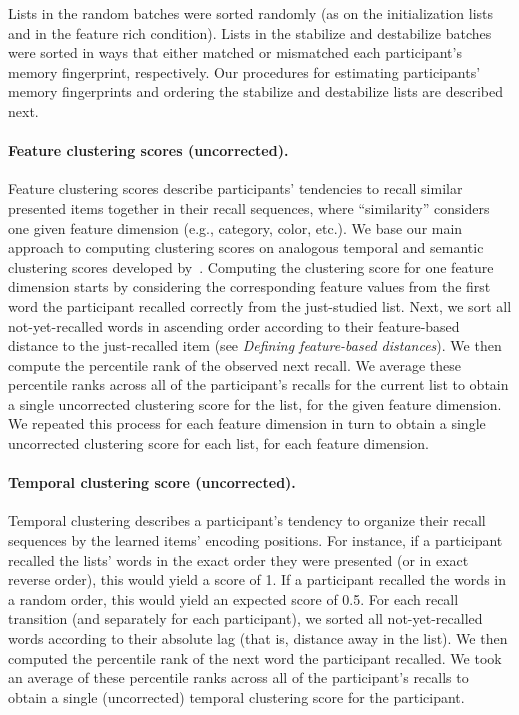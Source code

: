 \documentclass[11pt]{article}
\begin{document}
Lists in the random batches were sorted randomly (as on the initialization
lists and in the feature rich condition). Lists in the stabilize and
destabilize batches were sorted in ways that either matched or mismatched each
participant's memory fingerprint, respectively. Our procedures for estimating
participants' memory fingerprints and ordering the stabilize and destabilize
lists are described next.

\paragraph*{Feature clustering scores (uncorrected).}  

Feature clustering scores describe participants' tendencies to recall similar
presented items together in their recall sequences, where ``similarity''
considers one given feature dimension (e.g., category, color, etc.). We base
our main approach to computing clustering scores on analogous temporal and
semantic clustering scores developed by~\cite{PolyEtal09}. Computing the
clustering score for one feature dimension starts by considering the
corresponding feature values from the first word the participant recalled
correctly from the just-studied list. Next, we sort all not-yet-recalled words
in ascending order according to their feature-based distance to the
just-recalled item (see \textit{Defining feature-based distances}). We then
compute the percentile rank of the observed next recall. We average these
percentile ranks across all of the participant’s recalls for the current list
to obtain a single uncorrected clustering score for the list, for the given
feature dimension. We repeated this process for each feature dimension in turn
to obtain a single uncorrected clustering score for each list, for each feature
dimension.

\paragraph*{Temporal clustering score (uncorrected).}

Temporal clustering describes a participant's tendency to organize their recall
sequences by the learned items' encoding positions. For instance, if a
participant recalled the lists' words in the exact order they were presented
(or in exact reverse order), this would yield a score of 1. If a participant
recalled the words in a random order, this would yield an expected score of
0.5. For each recall transition (and separately for each participant), we
sorted all not-yet-recalled words according to their absolute lag (that is,
distance away in the list). We then computed the percentile rank of the next
word the participant recalled. We took an average of these percentile ranks
across all of the participant’s recalls to obtain a single (uncorrected)
temporal clustering score for the participant.
\end{document}
